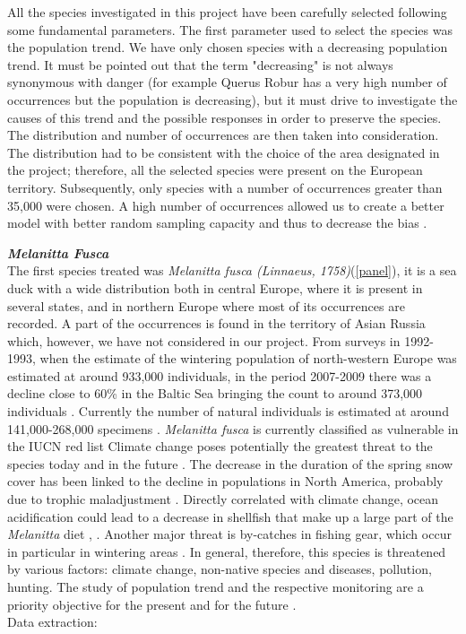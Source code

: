 \documentclass[12pt,a4paper]{article}
\begin{document}
All the species investigated in this project have been carefully selected following some fundamental parameters.
The first parameter used to select the species was the population trend. We have only chosen species with a decreasing population trend. It must be pointed out that the term "decreasing" is not always synonymous with danger (for example Querus Robur has a very high number of occurrences but the population is decreasing), but it must drive to investigate the causes of this trend and the possible responses in order to preserve the species.
The distribution and number of occurrences are then taken into consideration. The distribution had to be consistent with the choice of the area designated in the project; therefore, all the selected species were present on the European territory. Subsequently, only species with a number of occurrences greater than 35,000 were chosen. A high number of occurrences allowed us to create a better model with better random sampling capacity and thus to decrease the bias \citep {kaplan} .

\bigskip
{\noindent \textbf{\textit{Melanitta Fusca}}} 
\\
The first species treated was \textit{Melanitta fusca (Linnaeus, 1758)}(\ref{panel}), it is a sea duck with a wide distribution both in central Europe, where it is present in several states, and in northern Europe where most of its occurrences are recorded.
A part of the occurrences is found in the territory of Asian Russia which, however, we have not considered in our project.
From surveys in 1992-1993, when the estimate of the wintering population of north-western Europe was estimated at around 933,000 individuals, in the period 2007-2009 there was a decline close to 60\% in the Baltic Sea bringing the count to around 373,000 individuals \citep{skov}.
Currently the number of natural individuals is estimated at around 141,000-268,000 specimens \citep{IUCN}.
\textit{Melanitta fusca} is currently classified as vulnerable in the IUCN red list \citep{IUCN}
Climate change poses potentially the greatest threat to the species today and in the future . The decrease in the duration of the spring snow cover has been linked to the decline in populations in North America, probably due to trophic maladjustment \citep{drever}.
Directly correlated with climate change, ocean acidification could lead to a decrease in shellfish that make up a large part of the \textit{Melanitta} diet \citep{stein}, \citep{carb}.
Another major threat is by-catches in fishing gear, which occur in particular in wintering areas \citep*{dagys}.
In general, therefore, this species is threatened by various factors: climate change, non-native species and diseases, pollution, hunting.\citep{IUCN}
The study of population trend and the respective monitoring are a priority objective for the present and for the future \citep{IUCN}.\\
Data extraction: \citep{mela}
\end{document}
